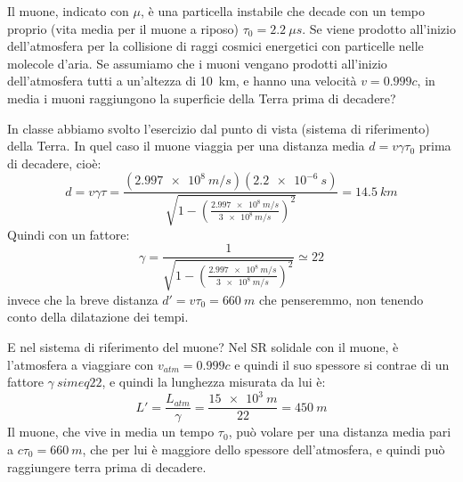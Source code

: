 \documentclass{article}
\begin{document}
\begin{Exercise}[title={Il decadimento del muone, visto dal muone}]
  Il muone, indicato con $\mu$, \`e una particella instabile che
  decade con un tempo proprio (vita media per il muone a riposo)
  $\tau_0=\SI{2.2}{\mu s}$. Se viene prodotto all'inizio
  dell'atmosfera per la collisione di raggi cosmici energetici con
  particelle nelle molecole d'aria. Se assumiamo che i muoni vengano
  prodotti all'inizio dell'atmosfera tutti a un'altezza di
  \SI{10}{km}, e hanno una velocit\`a $v=0.999c$, in media i muoni
  raggiungono la superficie della Terra prima di decadere?
\end{Exercise}
\begin{Answer}
  In classe abbiamo svolto l'esercizio dal punto di vista (sistema di riferimento) della Terra.
  In quel caso il muone viaggia per una distanza media $d = v\gamma\tau_0$ prima di decadere, cio\`e:
  \begin{equation*}
    d = v\gamma\tau = \frac{(\SI{2.997e8}{m/s})(\SI{2.2e-6}{s})}{\sqrt{1-\left(\frac{\SI{2.997e8}{m/s}}{\SI{3e8}{m/s}}\right)^2}} = \SI{14.5}{km}
  \end{equation*}
  Quindi con un fattore:
  \begin{equation*}
    \gamma = \frac{1}{\sqrt{1-\left(\frac{\SI{2.997e8}{m/s}}{\SI{3e8}{m/s}}\right)^2}} \simeq 22
  \end{equation*}
  invece che la breve distanza $d'=v\tau_0=\SI{660}{m}$ che penseremmo, non tenendo conto della dilatazione dei tempi.

  E nel sistema di riferimento del muone? Nel SR solidale con il muone, \`e l'atmosfera a viaggiare con $v_{atm}=0.999c$ e quindi il suo spessore si
  contrae di un fattore $\gamma \ simeq 22$, e quindi la lunghezza misurata da lui \`e:  
  \begin{equation*}
    L' = \frac{L_{atm}}{\gamma} = \frac{\SI{15e3}{m}}{22}  = \SI{450}{m}
  \end{equation*}
  Il muone, che vive in media un tempo $\tau_0$, pu\`o volare per una
  distanza media pari a $c\tau_0=\SI{660}{m}$, che per lui \`e
  maggiore dello spessore dell'atmosfera, e quindi pu\`o raggiungere
  terra prima di decadere.
\end{Answer}
\end{document}

